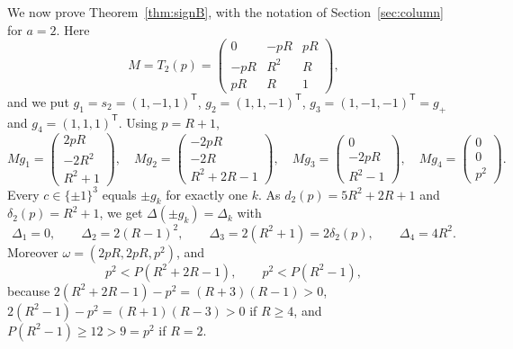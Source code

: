 \documentclass[11pt]{article}
\theoremstyle{remark}
\begin{document}
We now prove Theorem~\ref{thm:signB}, with the notation of
Section~\ref{sec:column} for $a=2$. Here
\[
M=T_2(p)=\begin{pmatrix}0&-pR&pR\\-pR&R^2&R\\pR&R&1\end{pmatrix},
\]
and we put $g_1=s_2=(1,-1,1)^{\mathsf T}$, $g_2=(1,1,-1)^{\mathsf T}$,
$g_3=(1,-1,-1)^{\mathsf T}=g_+$ and $g_4=(1,1,1)^{\mathsf T}$. Using $p=R+1$,
\[
Mg_1=\begin{pmatrix}2pR\\-2R^2\\R^2+1\end{pmatrix},\quad
Mg_2=\begin{pmatrix}-2pR\\-2R\\R^2+2R-1\end{pmatrix},\quad
Mg_3=\begin{pmatrix}0\\-2pR\\R^2-1\end{pmatrix},\quad
Mg_4=\begin{pmatrix}0\\0\\p^2\end{pmatrix}.
\]
Every $c\in\{\pm1\}^3$ equals $\pm g_k$ for exactly one $k$. As
$d_2(p)=5R^2+2R+1$ and $\delta_2(p)=R^2+1$, we get $\Delta(\pm g_k)=\Delta_k$
with
\begin{equation}\label{eq:Deltas}
\Delta_1=0,\qquad\Delta_2=2(R-1)^2,\qquad\Delta_3=2(R^2+1)=2\delta_2(p),
\qquad\Delta_4=4R^2.
\end{equation}
Moreover $\omega=(2pR,2pR,p^2)$, and
\begin{equation}\label{eq:Wtwo}
p^2<P(R^2+2R-1),\qquad p^2<P(R^2-1),
\end{equation}
because $2(R^2+2R-1)-p^2=(R+3)(R-1)>0$, $2(R^2-1)-p^2=(R+1)(R-3)>0$ if
$R\ge4$, and $P(R^2-1)\ge12>9=p^2$ if $R=2$.
\end{document}
